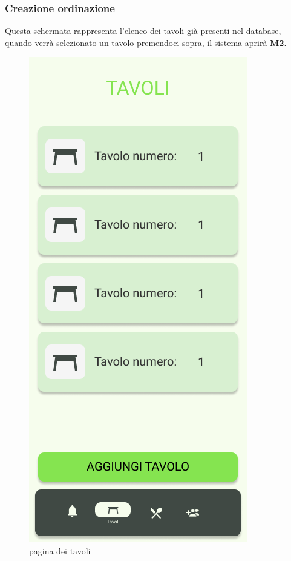 \subsubsection{Creazione ordinazione}
Questa schermata rappresenta l'elenco dei tavoli già presenti nel database, quando verrà selezionato un tavolo premendoci sopra, il sistema aprirà \textbf{M2}.
\begin{figure}[H]
  \centering
  \includegraphics[scale=0.6]{img/mock-up/tables.png}
  \caption{pagina dei tavoli}
\end{figure}\newpage

